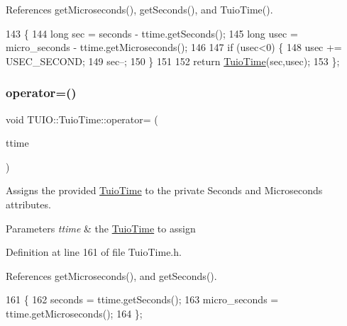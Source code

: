 References get\+Microseconds(), get\+Seconds(), and Tuio\+Time().


\begin{DoxyCode}
143                                            \{
144             \textcolor{keywordtype}{long} sec = seconds - ttime.getSeconds();
145             \textcolor{keywordtype}{long} usec = micro\_seconds - ttime.getMicroseconds();
146             
147             \textcolor{keywordflow}{if} (usec<0) \{
148                 usec += USEC\_SECOND;
149                 sec--;
150             \}
151             
152             \textcolor{keywordflow}{return} \hyperlink{class_t_u_i_o_1_1_tuio_time_a924521ecf43b6484fad9550661eedb0a}{TuioTime}(sec,usec);
153         \};
\end{DoxyCode}
\mbox{\label{class_t_u_i_o_1_1_tuio_time_a34ae143720ec8f24e8381775ffff340e}} 
\subsubsection{\texorpdfstring{operator=()}{operator=()}}
{\footnotesize\ttfamily void T\+U\+I\+O\+::\+Tuio\+Time\+::operator= (\begin{DoxyParamCaption}\item[{\hyperlink{class_t_u_i_o_1_1_tuio_time}{Tuio\+Time}}]{ttime }\end{DoxyParamCaption})\hspace{0.3cm}{\ttfamily [inline]}}

Assigns the provided \hyperlink{class_t_u_i_o_1_1_tuio_time}{Tuio\+Time} to the private Seconds and Microseconds attributes.


\begin{DoxyParams}{Parameters}
{\em ttime} & the \hyperlink{class_t_u_i_o_1_1_tuio_time}{Tuio\+Time} to assign \\
\hline
\end{DoxyParams}


Definition at line 161 of file Tuio\+Time.\+h.



References get\+Microseconds(), and get\+Seconds().


\begin{DoxyCode}
161                                        \{
162             seconds = ttime.getSeconds();
163             micro\_seconds = ttime.getMicroseconds();
164         \};
\end{DoxyCode}
\mbox{\label{class_t_u_i_o_1_1_tuio_time_a15f1b26aa7b3c9a10db9e4a7781a7765}} 
